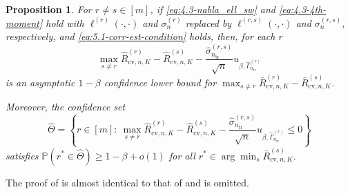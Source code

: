 \documentclass[11pt]{article}
\theoremstyle{plain}
\newtheorem{corollary}[theorem]{Corollary}
\newtheorem{proposition}[theorem]{Proposition}
\newcommand{\cv}{{\mathrm{cv}}}
\newcommand{\tr}{{\mathrm{tr}}}
\newcommand{\D}{{\mathcal{D}}}
\newcommand{\A}{{\mathcal{A}}}
\begin{document}
\begin{proposition}
    \label{pro:5.1-cvc-diff}
    For $r\neq s\in[m]$, if \eqref{eq:4.3-nabla_ell_sw} and \eqref{eq:4.3-4th-moment} hold with $\ell^{(r)}(\cdot,\cdot)$ and $\sigma_n^{(r)}$ replaced by
    $\ell^{(r,s)}(\cdot,\cdot)$ and $\sigma_n^{(r,s)}$, respectively, and \eqref{eq:5.1-corr-est-condition} holds, then, for each $r$
    $$
    \max_{s\neq r}\hat R_{\cv,n,K}^{(r)}-\hat R_{\cv,n,K}^{(s)}-\frac{\hat\sigma_{n_\tr}^{(r,s)}}{\sqrt{n}}u_{\beta,\hat\Gamma_{n_\tr}^{(r)}}
    $$
    is an asymptotic $1-\beta$ confidence lower bound for $\max_{s\neq r}\bar R_{\cv,n,K}^{(r)}-\bar R_{\cv,n,K}^{(s)}$.

    Moreover, the confidence set 
    \begin{equation}
        \label{eq:5.1-cvc}
        \hat\Theta=\left\{r\in[m]:~\max_{s\neq r}\hat R_{\cv,n,K}^{(r)}-\hat R_{\cv,n,K}^{(s)}-\frac{\hat\sigma_{n_\tr}^{(r,s)}}{\sqrt{n}}u_{\beta,\hat\Gamma_{n_\tr}^{(r)}}\le 0\right\}
    \end{equation}
    satisfies $\mathbb P(r^*\in\hat\Theta)\ge 1-\beta+o(1)$ for all $r^*\in\arg\min_s \bar{R}_{\cv,n,K}^{(s)}$.
\end{proposition}
The proof of  is almost identical to that of  and is omitted.


\end{document}
